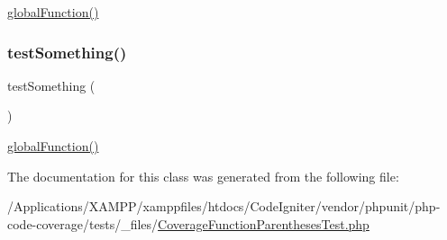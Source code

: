 \mbox{\hyperlink{php-code-coverage_2tests_2__files_2_covered_function_8php_a321be2fcdead5148a9cc7794f56f08ad}{global\+Function()}} \mbox{\label{class_coverage_function_parentheses_test_a0fc4e17369bc9607ebdd850d9eda8167}} 
\subsubsection{\texorpdfstring{test\+Something()}{testSomething()}\hspace{0.1cm}{\footnotesize\ttfamily [2/2]}}
{\footnotesize\ttfamily test\+Something (\begin{DoxyParamCaption}{ }\end{DoxyParamCaption})}

\mbox{\hyperlink{php-code-coverage_2tests_2__files_2_covered_function_8php_a321be2fcdead5148a9cc7794f56f08ad}{global\+Function()}} 

The documentation for this class was generated from the following file\+:\begin{DoxyCompactItemize}
\item 
/\+Applications/\+X\+A\+M\+P\+P/xamppfiles/htdocs/\+Code\+Igniter/vendor/phpunit/php-\/code-\/coverage/tests/\+\_\+files/\mbox{\hyperlink{php-code-coverage_2tests_2__files_2_coverage_function_parentheses_test_8php}{Coverage\+Function\+Parentheses\+Test.\+php}}\end{DoxyCompactItemize}
